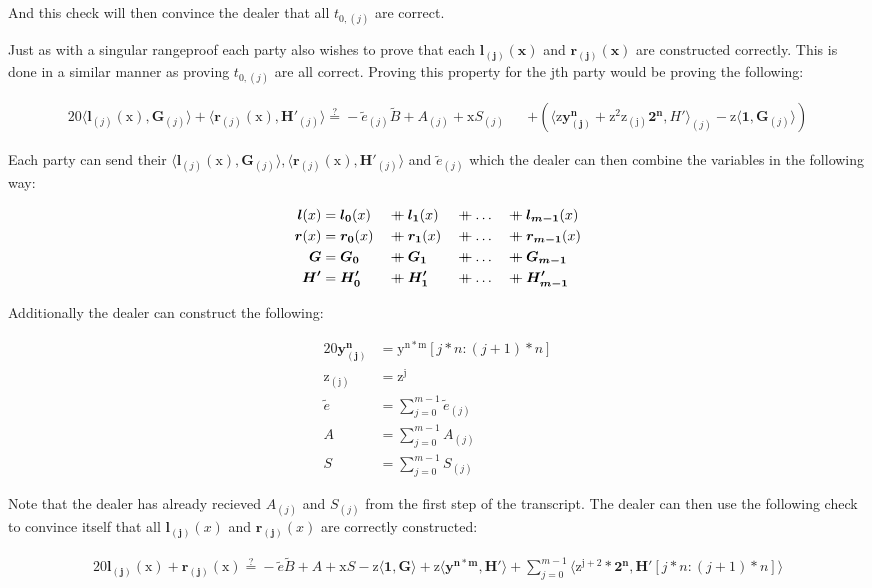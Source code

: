 \documentclass{article}
\newcommand{\eq}[1]{\begin{alignat*}{20}#1\end{alignat*}}
\renewcommand{\vec}[1]{\boldsymbol{#1}}
\newcommand{\ran}[1]{\mathrm{#1}}
\newcommand{\vecran}[1]{\mathbf{#1}}
\newcommand\concat{\mathbin{+\mkern-10mu+}} %
\newcommand{\dotp}[2]{\langle #1, #2 \rangle}
\begin{document}
And this check will then convince the dealer that all $t_{0,(j)}$ are correct.

Just as with a singular rangeproof each party also wishes to prove that each $\vec{l_{(j)}(x)}$ and $\vec{r_{(j)}(x)}$ are constructed correctly. This is done in a similar manner as proving $t_{0,(j)}$ are all correct. Proving this property for the jth party would be proving the following:

\eq{
	\dotp{\vec{l}_{(j)}(\ran{x})}{\vec{G}_{(j)}} + \dotp{\vec{r}_{(j)}(\ran{x})}{\vec{H'}_{(j)}} \stackrel{?}{=} -\widetilde{e}_{(j)}\widetilde{B} + A_{(j)} + \ran{x}S_{(j)} &&+ (\dotp{\ran{z}\vecran{y^n_{(j)}} + \ran{z^2}\ran{z_{(j)}}\vec{2^n}}{H'}_{(j)} - \ran{z}\dotp{\vec{1}}{\vec{G}_{(j)}})
}

Each party can send their $\dotp{\vec{l}_{(j)}(\ran{x})}{\vec{G}_{(j)}}, \dotp{\vec{r}_{(j)}(\ran{x})}{\vec{H'}_{(j)}}$ and $\widetilde{e}_{(j)}$ which the dealer can then combine the variables in the following way:

\eq{
	\vec{l}(x) &= \vec{l_0}(x) &&\concat \vec{l_1}(x) &&\concat \dots &&\concat \vec{l_{m-1}}(x)\\
	\vec{r}(x) &= \vec{r_0}(x) &&\concat \vec{r_1}(x) &&\concat \dots &&\concat \vec{r_{m-1}}(x)\\
	\vec{G} &= \vec{G_0} &&\concat \vec{G_1} &&\concat \dots &&\concat \vec{G_{m-1}}\\
	\vec{H'} &= \vec{H'_0} &&\concat \vec{H'_1} &&\concat \dots &&\concat \vec{H'_{m-1}}
}

Additionally the dealer can construct the following:

\eq{
	\vecran{y^n_{(j)}} &= \ran{y^{n*m}}[j*n : (j+1)*n]\\
	\ran{z_{(j)}} &= \ran{z^j}\\
	\widetilde{e} &= \sum^{m-1}_{j = 0} \widetilde{e}_{(j)}\\
	A &= \sum^{m-1}_{j = 0} A_{(j)}\\
	S &= \sum^{m-1}_{j = 0} S_{(j)}
}

Note that the dealer has already recieved $A_{(j)}$ and $S_{(j)}$ from the first step of the transcript. The dealer can then use the following check to convince itself that all $\vec{l_{(j)}}(x)$ and $\vec{r_{(j)}}(x)$ are correctly constructed:

\eq{
	\vec{l_{(j)}}(\ran{x}) + \vec{r_{(j)}}(\ran{x}) \stackrel{?}{=} -\widetilde{e}\widetilde{B} + A + \ran{x}S - \ran{z}\dotp{\vec{1}}{\vec{G}} + \ran{z}\dotp{\vecran{y^{n*m}}}{\vec{H'}} + \sum^{m-1}_{j = 0}\dotp{\ran{z^{j+2}}*\vec{2^n}}{\vec{H'}[j*n: (j+1)*n]}
}
\end{document}

